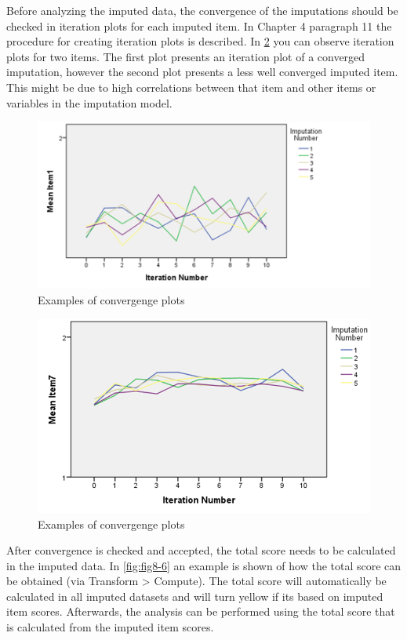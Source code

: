 \documentclass[]{book}
\begin{document}
Before analyzing the imputed data, the convergence of the imputations
should be checked in iteration plots for each imputed item. In Chapter 4
paragraph 11 the procedure for creating iteration plots is described. In
\ref{fig:fig8-5} you can observe iteration plots for two items. The
first plot presents an iteration plot of a converged imputation, however
the second plot presents a less well converged imputed item. This might
be due to high correlations between that item and other items or
variables in the imputation model.

\begin{figure}

{\centering \includegraphics[width=0.9\linewidth]{images/fig8.5a} 

}

\caption{Examples of convergenge plots}\label{fig:fig8-5}
\end{figure}\begin{figure}

{\centering \includegraphics[width=0.9\linewidth]{images/fig8.5b} 

}

\caption{Examples of convergenge plots}\label{fig:fig8-5}
\end{figure}

After convergence is checked and accepted, the total score needs to be
calculated in the imputed data. In \ref{fig:fig8-6} an example is shown
of how the total score can be obtained (via Transform \textgreater{}
Compute). The total score will automatically be calculated in all
imputed datasets and will turn yellow if its based on imputed item
scores. Afterwards, the analysis can be performed using the total score
that is calculated from the imputed item scores.
\end{document}
